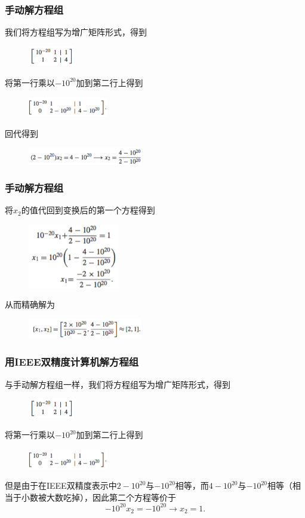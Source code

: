 \documentclass[10pt]{beamer}
\begin{document}
\begin{frame}
\frametitle{手动解方程组}
我们将方程组写为增广矩阵形式，得到
\begin{figure}
\includegraphics[width=2cm]{figs/2_3_Swamping-1} 
\end{figure}
将第一行乘以$-10^{20}$加到第二行上得到
\begin{figure}
\includegraphics[width=3.5cm]{figs/2_3_Swamping-2} 
\end{figure}
回代得到
\begin{figure}
\includegraphics[width=5cm]{figs/2_3_Swamping-3} 
\end{figure}
\end{frame}


\begin{frame}
\frametitle{手动解方程组}
将$x_2$的值代回到变换后的第一个方程得到
\begin{figure}
\includegraphics[width=4cm]{figs/2_3_Swamping-4} 
\end{figure}
从而精确解为
\begin{figure}
\includegraphics[width=5cm]{figs/2_3_Swamping-5} 
\end{figure}
\end{frame}


\begin{frame}
\frametitle{用IEEE双精度计算机解方程组}
与手动解方程组一样，我们将方程组写为增广矩阵形式，得到
\begin{figure}
\includegraphics[width=2cm]{figs/2_3_Swamping-1} 
\end{figure}
将第一行乘以$-10^{20}$加到第二行上得到
\begin{figure}
\includegraphics[width=3.5cm]{figs/2_3_Swamping-2} 
\end{figure}
但是由于在IEEE双精度表示中$2-10^{20}$与$-10^{20}$相等，而$4-10^{20}$与$-10^{20}$相等（相当于小数被大数吃掉），因此第二个方程等价于
\begin{equation}
-10^{20} x_2 = -10^{20}  \rightarrow x_2 = 1.
\end{equation}
\end{frame}
\end{document}
